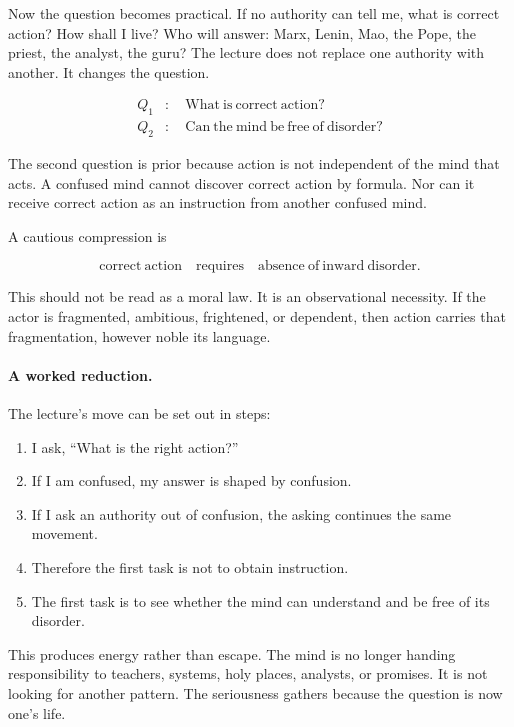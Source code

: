Now the question becomes practical. If no authority can tell me, what is correct action? How shall I live? Who will answer: Marx, Lenin, Mao, the Pope, the priest, the analyst, the guru? The lecture does not replace one authority with another. It changes the question.

\begin{align}
Q_1 &: \quad \mathrm{What\ is\ correct\ action?}\\
Q_2 &: \quad \mathrm{Can\ the\ mind\ be\ free\ of\ disorder?}
\end{align}

The second question is prior because action is not independent of the mind that acts. A confused mind cannot discover correct action by formula. Nor can it receive correct action as an instruction from another confused mind.

A cautious compression is

\begin{equation}
\mathrm{correct\ action}
\quad \mathrm{requires} \quad
\mathrm{absence\ of\ inward\ disorder}.
\end{equation}

This should not be read as a moral law. It is an observational necessity. If the actor is fragmented, ambitious, frightened, or dependent, then action carries that fragmentation, however noble its language.

\paragraph{A worked reduction.}
The lecture's move can be set out in steps:

\begin{enumerate}
\item I ask, ``What is the right action?''
\item If I am confused, my answer is shaped by confusion.
\item If I ask an authority out of confusion, the asking continues the same movement.
\item Therefore the first task is not to obtain instruction.
\item The first task is to see whether the mind can understand and be free of its disorder.
\end{enumerate}

This produces energy rather than escape. The mind is no longer handing responsibility to teachers, systems, holy places, analysts, or promises. It is not looking for another pattern. The seriousness gathers because the question is now one's life.

